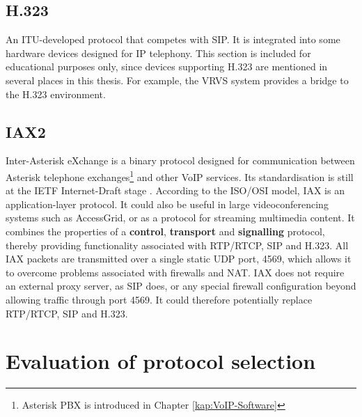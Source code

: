 \subsection{H.323}
An ITU-developed protocol that competes with SIP. It is integrated into some hardware devices designed for IP telephony. This section is included for educational purposes only, since devices supporting H.323 are mentioned in several places in this thesis. For example, the VRVS system provides a bridge to the H.323 environment.

\subsection{IAX2}\label{kap:IAX2}
Inter-Asterisk eXchange is a binary protocol designed for communication between Asterisk telephone exchanges\footnote{Asterisk PBX is introduced in Chapter \protect\ref{kap:VoIP-Software}} and other VoIP services. Its standardisation is still at the IETF Internet-Draft stage \cite{IETFDraft-IAX2}. According to the ISO/OSI model, IAX is an application-layer protocol. It could also be useful in large videoconferencing systems such as AccessGrid, or as a protocol for streaming multimedia content. It combines the properties of a \textbf{control}, \textbf{transport} and \textbf{signalling} protocol, thereby providing functionality associated with RTP/RTCP, SIP and H.323. All IAX packets are transmitted over a single static UDP port, 4569, which allows it to overcome problems associated with firewalls and NAT. IAX does not require an external proxy server, as SIP does, or any special firewall configuration beyond allowing traffic through port 4569. It could therefore potentially replace RTP/RTCP, SIP and H.323.

\section{Evaluation of protocol selection}

